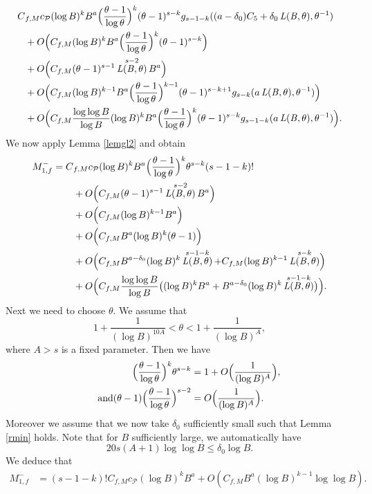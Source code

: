 \documentclass[JEP,XML,SOM,Unicode,published]{cedram}
\DeclareMathOperator{\LBt}{\mathit{L(B,\theta)}}
\let\del\delta
\let\tet\theta
\newcommand{\calP}{\mathcal{P}}
\theoremstyle{definition}
\numberwithin{theorem}{section}
\begin{document}
\begin{equation*}
\begin{split}
C&_{f,M}c_{\calP} (\log B)^kB^{a} \Bigl(\frac{\tet -1}{\log \tet}\Bigr)^k (\tet-1)^{s-k} g_{s-1-k}((a-\del_0) C_5 + \del_0 \LBt, \tet^{-1}) \\
&+O\Bigl(C_{f,M} (\log B)^kB^{a} \Bigl(\frac{\tet -1}{\log \tet}\Bigr)^k (\tet-1)^{s-k}\Bigr)\\
&+O\Bigl(C_{f,M} (\tet -1)^{s-1} \LBt^{s-2} B^{a} \Bigr)\\
&+O\Bigl(C_{f,M} (\log B)^{k-1} B^{a} \Bigl(\frac{\tet -1}{\log \tet}\Bigr)^{k-1}(\tet-1)^{s-k+1} g_{s-k}(a \LBt, \tet^{-1}) \Bigr)\\
&+O\Bigl(C_{f,M}\frac{\log \log B}{\log B} (\log B)^kB^{a} \Bigl(\frac{\tet -1}{\log \tet}\Bigr)^k (\tet-1)^{s-k} g_{s-1-k}(a\LBt, \tet^{-1})\Bigr).
\end{split}
\end{equation*}
We now apply Lemma \ref{lemgl2} and obtain
\begin{equation*}
\begin{split}
M_{1,f}^- = C&_{f,M}c_{\calP} (\log B)^kB^{a} \Bigl(\frac{\tet -1}{\log \tet}\Bigr)^k \tet^{s-k} (s-1-k)!\\
&+O\Bigl(C_{f,M} (\tet -1)^{s-1} \LBt^{s-2} B^{a} \Bigr)\\
&+O\Bigl(C_{f,M} (\log B)^{k-1} B^{a} \Bigr)\\
&+O\Bigl(C_{f,M} B^{a} (\log B)^k (\tet-1)\Bigr)\\
&+ O\Bigl(C_{f,M} B^{a-\del_0}(\log B)^k \LBt^{s-1-k} + C_{f,M} (\log B)^{k-1} \LBt^{s-k} \Bigr)\\
&+O\Bigl(C_{f,M} \frac{\log\log B}{\log B}\bigl((\log B)^kB^{a}+ B^{a-\del_0}(\log B)^k \LBt^{s-1-k} \bigr) \Bigr).
\end{split}
\end{equation*}
Next we need to choose $\tet$. We assume that
\begin{equation}\label{eqn80b}
1+\frac{1}{(\log B)^{10A}}<\tet< 1+\frac{1}{(\log B)^A},
\end{equation}
where $A>s$ is a fixed parameter. Then we have
\begin{align*}
\Bigl(\frac{\tet -1}{\log \tet}\Bigr)^k \tet^{s-k}&= 1+O\Bigl(\frac{1}{(\log B)^A}\Bigr),
\\
\tag*{and}
(\tet-1) \Bigl(\frac{\tet -1}{\log \tet}\Bigr)^{s-2} &= O\Bigl(\frac{1}{(\log B)^A}\Bigr).
\end{align*}
Moreover we assume that we now take $\del_0$ sufficiently small such that Lemma \ref{rmin} holds. Note that for $B$ sufficiently large, we automatically have
\[
20s (A+1) \log \log B\leq \del_0 \log B.
\]
We deduce that
\begin{equation*}
\begin{split}
M_{1,f}^- &= (s-1-k)! C_{f,M}c_{\calP} (\log B)^kB^{a} +O\left(C_{f,M} B^{a} (\log B)^{k-1} \log \log B \right).
\end{split}
\end{equation*}
\end{document}
